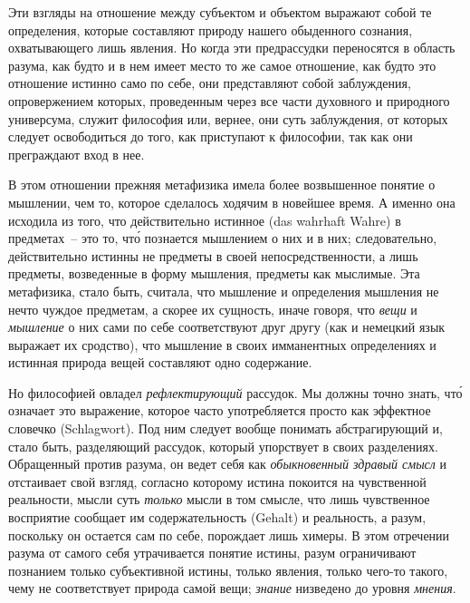 Эти взгляды на отношение между субъектом и объектом
выражают собой те определения, которые составляют
природу нашего обыденного сознания, охватывающего
лишь явления. Но когда эти предрассудки переносятся
в область разума, как будто и в нем имеет место то же
самое отношение, как будто это отношение истинно само
по себе, они представляют собой заблуждения, опровержением
которых, проведенным через все части духовного
и природного универсума, служит философия или, вернее,
они суть заблуждения, от которых следует освободиться
до того, как приступают к философии, так как они преграждают
вход в нее.

В этом отношении прежняя метафизика имела более
возвышенное понятие о мышлении, чем то, которое сделалось
ходячим в новейшее время. А именно она исходила
из того, что действительно истинное (das wahrhaft
Wahre) в предметах~-- это то, чт\'о познается мышлением
о них и в них; следовательно, действительно истинны
не предметы в своей непосредственности, а лишь предметы,
возведенные в форму мышления, предметы как
мыслимые. Эта метафизика, стало быть, считала, что
мышление и определения мышления не нечто чуждое
предметам, а скорее их сущность, иначе говоря, что \emph{вещи}
и \emph{мышление} о них сами по себе соответствуют друг
другу (как и немецкий язык выражает их сродство)\endnotemark{},
что мышление в своих имманентных определениях и
истинная природа вещей составляют одно содержание.


Но философией овладел \emph{рефлектирующий} рассудок.
Мы должны точно знать, чт\'о означает это выражение,
которое часто употребляется просто как эффектное
словечко (Schlagwort). Под ним следует вообще понимать
абстрагирующий и, стало быть, разделяющий рассудок,
который упорствует в своих разделениях. Обращенный
против разума, он ведет себя как \emph{обыкновенный здравый
смысл} и отстаивает свой взгляд, согласно которому истина
покоится на чувственной реальности, мысли суть
\emph{только} мысли в том смысле, что лишь чувственное восприятие
сообщает им содержательность (Gehalt) и реальность,
а разум, поскольку он остается сам по себе,
порождает лишь химеры\endnotemark{}. В этом отречении разума от
самого себя утрачивается понятие истины, разум ограничивают
познанием только субъективной истины, только
явления, только чего-то такого, чему не соответствует
природа самой вещи; \emph{знание} низведено до уровня \emph{мнения}.

